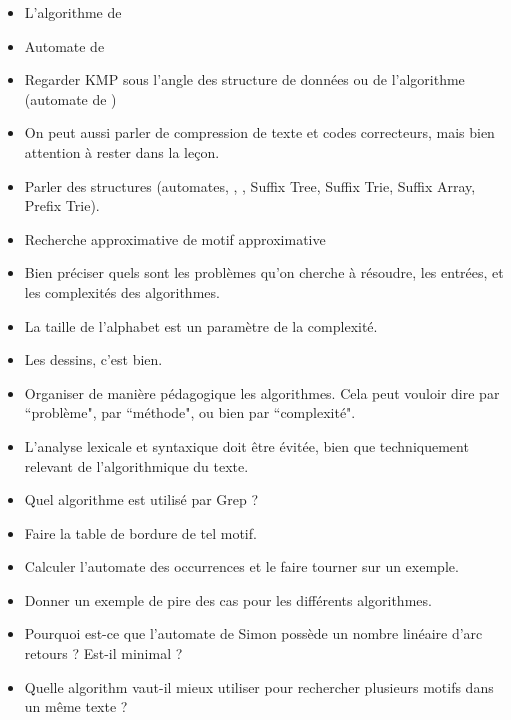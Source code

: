 \documentclass{agregfiche}
\begin{document}
\begin{itemize}
	\item L'algorithme de 
	\item Automate de 
	\item Regarder KMP sous l'angle des structure de données 
	ou de l'algorithme (automate de )
	\item 
	On peut aussi parler de compression de texte et codes 
	correcteurs, mais bien attention à rester dans la leçon.
	\item 
	Parler des structures (automates, , ,
	Suffix Tree, Suffix Trie, Suffix Array, Prefix Trie).
	
	\item Recherche approximative de motif approximative
\end{itemize}

\secpieges

\begin{itemize}
    \item Bien préciser quels sont les problèmes qu'on cherche 
        à résoudre, les entrées, et les complexités des algorithmes.

    \item La taille de l'alphabet est un paramètre de la complexité.

    \item Les dessins, c'est bien.

    \item Organiser de manière pédagogique les algorithmes.
        Cela peut vouloir dire par ``problème", par ``méthode", ou 
        bien par ``complexité".

    \item L'analyse lexicale et syntaxique doit être évitée, bien que techniquement
        relevant de l'algorithmique du texte.

\end{itemize}

\secquestionsclassiques

\begin{itemize}
    \item Quel algorithme est utilisé par Grep ?
    \item Faire la table de bordure de tel motif.
    \item Calculer l'automate des occurrences et le faire tourner sur un exemple.
    \item Donner un exemple de pire des cas pour les différents algorithmes.
    \item Pourquoi est-ce que l'automate de Simon possède un nombre linéaire
        d'arc retours ? Est-il minimal ?
    \item Quelle algorithm vaut-il mieux utiliser pour rechercher 
    plusieurs motifs dans un même texte ?
\end{itemize}
\end{document}
